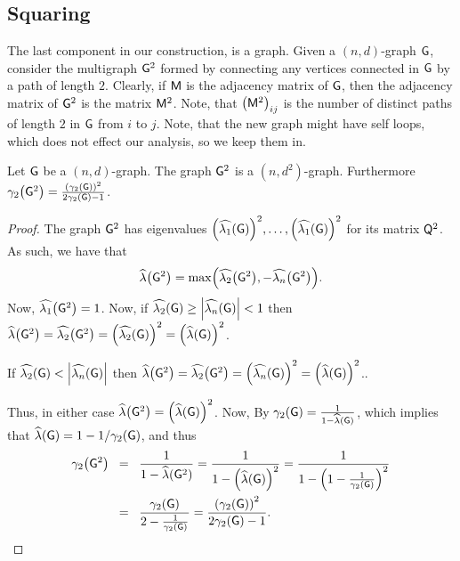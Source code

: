 \subsection{Squaring}

The last component in our construction, is
 a graph. Given a $(n,d)$-graph
$\mathsf{G}$, consider the multigraph $\mathsf{G}^2$ formed by connecting any vertices
connected in $\mathsf{G}$ by a path of length $2$. Clearly, if $\mathsf{M}$ is
the adjacency matrix of $\mathsf{G}$, then the adjacency matrix of
$\mathsf{G}^2$ is the matrix $\mathsf{M}^2$. Note, that $\pth{\Mtrx^2}_{ij}$ is
the number of distinct paths of length $2$ in $\mathsf{G}$ from $i$ to
$j$. Note, that the new graph might have self loops, which does not
effect our analysis, so we keep them in. 

\begin{lemma}
    Let $\mathsf{G}$ be a $(n,d)$-graph.  The graph $\mathsf{G}^2$ is a
    $(n,d^2)$-graph. Furthermore $\BiDialX{\Graph^2} =
    \frac{\pth{\BiDialX{\Graph}}^2}{2\BiDialX{\Graph} - 1}$.
\end{lemma}

\begin{proof}
    The graph $\mathsf{G}^2$ has eigenvalues $\pth{\TEV{1}(\Graph)}^2,
    \ldots, \pth{\TEV{1}(\Graph)}^2$ for its matrix $\mathsf{Q}^2$. As
    such, we have that
    \[
    \EVal\pth{\Graph^2} = \max\pth{\TEV{2}\pth{\Graph^2},
       -\TEV{n}\pth{\Graph^2}}.
    \]
    Now, $\TEV{1}\pth{\Graph^2} = 1$. Now, if $\widehat{\lambda_{2}}(\mathsf{G}) \geq
    \left| {\widehat{\lambda_{n}}(\mathsf{G})} \right| < 1$ then $\EVal\pth{\Graph^2} =
    \TEV{2}\pth{\Graph^2} = \pth{\TEV{2}\pth{\Graph}}^2 =
    \pth{\EVal\pth{\Graph}}^2$.

    If $\widehat{\lambda_{2}}(\mathsf{G}) < \left| {\widehat{\lambda_{n}}(\mathsf{G})} \right|$ then
    $\EVal\pth{\Graph^2} = \TEV{2}\pth{\Graph^2} = 
    \pth{\TEV{n}\pth{\Graph}}^2 = \pth{\EVal\pth{\Graph}}^2$..
    
    Thus, in either case $\EVal\pth{\Graph^2} =
    \pth{\EVal\pth{\Graph}}^2$. Now, By 
    $\BiDialX{\Graph} = \frac{1}{1-\EVal\pth{\Graph}}$, which implies
    that $\EVal(\Graph) = 1- 1/\BiDialX{\Graph}$, and thus
    \begin{align*}
        \BiDialX{\Graph^2}%
        &\EQ %
        \frac{1}{1-\EVal\pth{\Graph^2}}%
        =%
        \frac{1}{1-\pth{\EVal\pth{\Graph}}^2}%
        =%
        \frac{1}{1-\pth{1- \frac{1}{\BiDialX{\Graph}}}^2}%
        \\&%
        \EQ%
        \frac{\BiDialX{\Graph}}{2- \frac{1}{\BiDialX{\Graph}}}%
        =%
        \frac{\pth{\BiDialX{\Graph}}^2}{2\BiDialX{\Graph} - 1}.
    \end{align*}
\end{proof}


